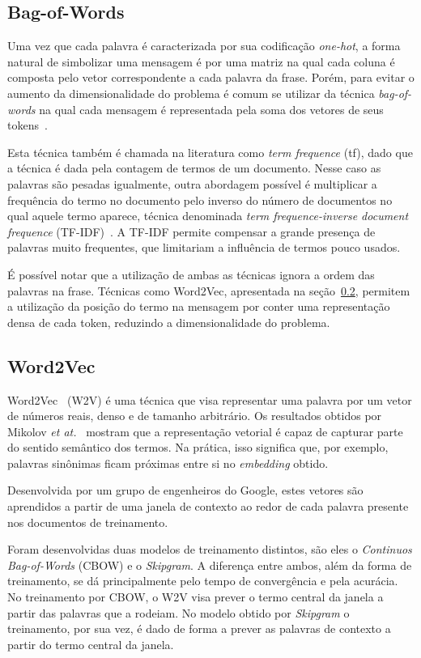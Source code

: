\subsection{Bag-of-Words}

Uma vez que cada palavra é caracterizada por sua codificação \textit{one-hot}, a forma natural de simbolizar uma mensagem
é por uma matriz na qual cada coluna é composta pelo vetor correspondente a cada palavra da frase.
Porém, para evitar o aumento da dimensionalidade do problema é comum se utilizar da técnica \textit{bag-of-words} na
qual cada mensagem é representada pela soma dos vetores de seus tokens~\cite{schutze08}.

Esta técnica também é chamada na literatura como \textit{term frequence} (tf), dado que a técnica é dada pela contagem
de termos de um documento.
Nesse caso as palavras são pesadas igualmente, outra abordagem possível é multiplicar a frequência do termo no documento
pelo inverso do número de documentos no qual aquele termo aparece, técnica denominada \textit{term frequence-inverse
document frequence} (TF-IDF)~\cite{salton88}.
A TF-IDF permite compensar a grande presença de palavras muito frequentes, que limitariam a influência de termos pouco
usados.

É possível notar que a utilização de ambas as técnicas ignora a ordem das palavras na frase.
Técnicas como Word2Vec, apresentada na seção~\ref{w2v}, permitem a utilização da posição do termo na mensagem por conter
uma representação densa de cada token, reduzindo a dimensionalidade do problema.

\subsection{Word2Vec}\label{w2v}

Word2Vec~\cite{mikolov13} (W2V) é uma técnica que visa representar uma palavra por um vetor de números reais, denso e de
tamanho arbitrário.
Os resultados obtidos por Mikolov \textit{et at.}~\cite{mikolov13} mostram que a representação vetorial é capaz de
capturar parte do sentido semântico dos termos.
Na prática, isso significa que, por exemplo, palavras sinônimas ficam próximas entre si no \textit{embedding} obtido.

Desenvolvida por um grupo de engenheiros do Google, estes vetores são aprendidos a partir de uma janela de contexto
ao redor de cada palavra presente nos documentos de treinamento.

Foram desenvolvidas duas modelos de treinamento distintos, são eles o \textit{Continuos Bag-of-Words} (CBOW) e o
\textit{Skipgram}.
A diferença entre ambos, além da forma de treinamento, se dá principalmente pelo tempo de convergência e pela acurácia.
No treinamento por CBOW, o W2V visa prever o termo central da janela a partir das palavras que a rodeiam.
No modelo obtido por \textit{Skipgram} o treinamento, por sua vez, é dado de forma a prever as palavras de contexto a
partir do termo central da janela.

